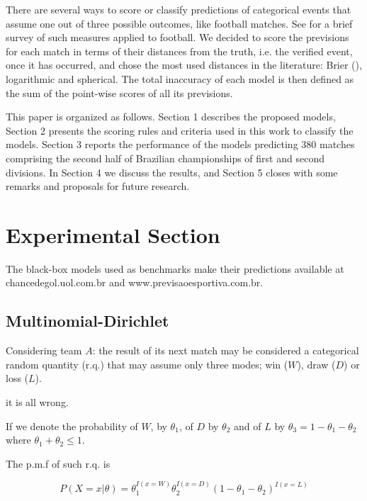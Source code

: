 \documentclass[journal,article,accept,moreauthors,pdftex,12pt,a4paper]{mdpi}
\begin{document}
There are several ways to score or classify predictions of categorical events that assume one out of three possible outcomes, like football matches.
See \cite{constantinou} for a brief survey of such measures applied to football.
We decided to score the previsions for each match in terms of their distances from the truth, i.e. the verified event, once it has occurred, and chose the most used distances in the literature: Brier (\cite{brier1950}), logarithmic and spherical.
The total inaccuracy of each model is then defined as the sum of the point-wise scores of all its previsions.

This paper is organized as follows.
Section 1 describes the proposed models, Section 2 presents the scoring rules and criteria used in this work to classify the models.
Section 3 reports the performance of the models predicting 380 matches comprising the second half of Brazilian championships of first and second divisions.
In Section 4 we discuss the results, and Section 5 closes with some remarks and proposals for future research.





\section{Experimental Section}

The black-box models used as benchmarks make their predictions available at {chancedegol.uol.com.br} and {www.previsaoesportiva.com.br}.


\subsection{Multinomial-Dirichlet}

Considering team $A$: the result of its next match may be considered a categorical random quantity (r.q.) that may assume only three modes; win ($W$), draw ($D$) or loss ($L$).

it is all wrong.

If we denote the probability of $W$, by $\theta_1$, of $D$ by $\theta_2$ and of $L$ by $\theta_3=1-\theta_1-\theta_2$ where $\theta_1+\theta_2\leq 1$.

The p.m.f of such r.q. is

\[
P(X=x|\theta)=\theta_1^{I(x=W)}\theta_2^{I(x=D)}(1-\theta_1-\theta_2)^{I(x=L)}
\]
\end{document}
